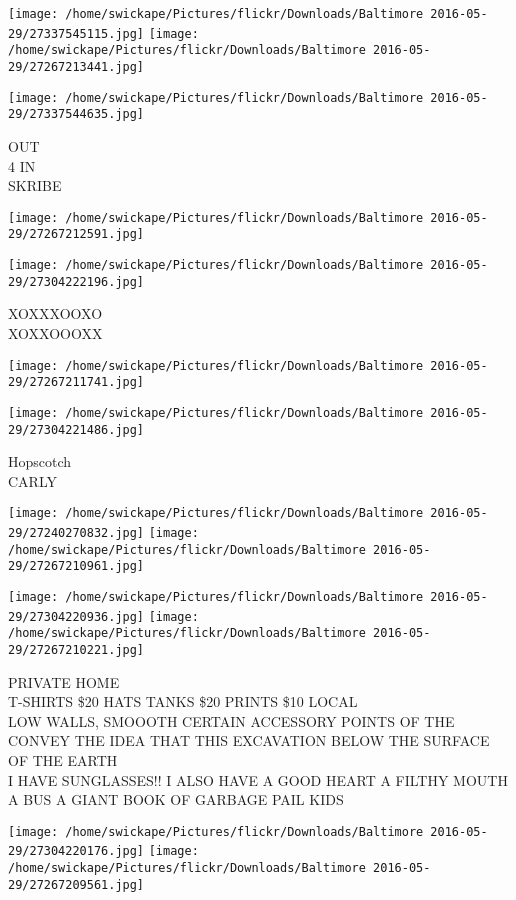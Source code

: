 \documentclass[10pt,letterpaper]{article}
\begin{document}
\texttt{[image: /home/swickape/Pictures/flickr/Downloads/Baltimore 2016-05-29/27337545115.jpg]}
\texttt{[image: /home/swickape/Pictures/flickr/Downloads/Baltimore 2016-05-29/27267213441.jpg]}

\vspace{0.25in}
\texttt{[image: /home/swickape/Pictures/flickr/Downloads/Baltimore 2016-05-29/27337544635.jpg]}

OUT\\
4 IN\\
SKRIBE
\pagebreak

\texttt{[image: /home/swickape/Pictures/flickr/Downloads/Baltimore 2016-05-29/27267212591.jpg]}

\vspace{0.25in}
\texttt{[image: /home/swickape/Pictures/flickr/Downloads/Baltimore 2016-05-29/27304222196.jpg]}

XOXXXOOXO\\
XOXXOOOXX
\pagebreak

\texttt{[image: /home/swickape/Pictures/flickr/Downloads/Baltimore 2016-05-29/27267211741.jpg]}

\vspace{0.25in}
\texttt{[image: /home/swickape/Pictures/flickr/Downloads/Baltimore 2016-05-29/27304221486.jpg]}

Hopscotch\\
CARLY
\pagebreak

\texttt{[image: /home/swickape/Pictures/flickr/Downloads/Baltimore 2016-05-29/27240270832.jpg]}
\texttt{[image: /home/swickape/Pictures/flickr/Downloads/Baltimore 2016-05-29/27267210961.jpg]}

\texttt{[image: /home/swickape/Pictures/flickr/Downloads/Baltimore 2016-05-29/27304220936.jpg]}
\texttt{[image: /home/swickape/Pictures/flickr/Downloads/Baltimore 2016-05-29/27267210221.jpg]}

PRIVATE HOME\\
T{-}SHIRTS \$20 HATS TANKS \$20 PRINTS \$10 LOCAL\\
LOW WALLS, SMOOOTH CERTAIN ACCESSORY POINTS OF THE CONVEY THE IDEA THAT THIS EXCAVATION BELOW THE SURFACE OF THE EARTH\\
I HAVE SUNGLASSES!!  I ALSO HAVE A GOOD HEART A FILTHY MOUTH A BUS A GIANT BOOK OF GARBAGE PAIL KIDS
\pagebreak

\texttt{[image: /home/swickape/Pictures/flickr/Downloads/Baltimore 2016-05-29/27304220176.jpg]}
\texttt{[image: /home/swickape/Pictures/flickr/Downloads/Baltimore 2016-05-29/27267209561.jpg]}
\end{document}
